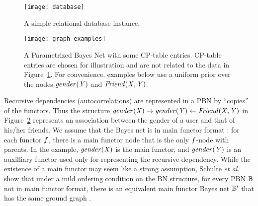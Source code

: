 \documentclass[twoside,leqno,twocolumn]{article}
\begin{document}



\begin{figure}[htbp]
\begin{center}
\texttt{[image: database]}
\caption{A simple relational database instance.
\label{fig:db-tables}}
\end{center}
\end{figure}


\begin{figure}[hbpt]
\begin{center}
\texttt{[image: graph-examples]}
\caption{%
A Parametrized Bayes Net with some CP-table entries. CP-table entries are chosen for illustration and are not related to the data in Figure~\ref{fig:db-tables}. For convenience, examples below use a uniform prior over the nodes $\it{gender}(Y)$ and $\it{Friend}(X,Y)$.
\label{fig:pbn}}
\end{center}
\end{figure}

Recursive dependencies (autocorrelations) are represented in a PBN by ``copies'' of the functors. Thus the structure $\it{gender}(X) \rightarrow \it{gender}(Y) \leftarrow \it{Friend}(X,Y)$ in Figure~\ref{fig:pbn} represents an association between the gender of a user and that of his/her friends. We assume that the Bayes net is in main functor format \cite{Schulte2012a}: for each functor $f$, there is a main functor node that is the only $f$-node with parents. In the example, $\it{gender}(X)$ is the main functor, and $\it{gender}(Y)$ is an auxilliary functor used only for representing the recursive dependency. 
While the existence of a main functor may seem like a strong assumption, Schulte {\em et al.} show that under a mild ordering condition on the BN structure, for every PBN $\mathbb{B}$ not in main functor format, there is an equivalent main functor Bayes net $\mathbb{B}'$ that has the same ground graph \cite{Schulte2012a}.
  
\end{document}

